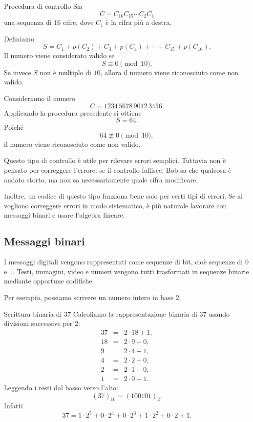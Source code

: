 \documentclass[a4paper]{article}
\begin{document}
\begin{snippetdefinition}{Procedura di controllo}
    Sia
    \[
        C=C_{16}C_{15}\cdots C_2C_1
    \]
    una sequenza di \(16\) cifre, dove \(C_1\) è la cifra più a destra.

    Definiamo
    \[
        S
        =
        C_1+p(C_2)+C_3+p(C_4)+\cdots+C_{15}+p(C_{16}).
    \]
    Il numero viene considerato valido se
    \[
        S\equiv 0 \pmod{10}.
    \]
    Se invece \(S\) non è multiplo di \(10\), allora il numero viene riconosciuto come non valido.
\end{snippetdefinition}

\begin{snippetexample}{}
    Consideriamo il numero
    \[
        C=1234\,5678\,9012\,3456.
    \]
    Applicando la procedura precedente si ottiene
    \[
        S=64.
    \]
    Poiché
    \[
        64\not\equiv 0 \pmod{10},
    \]
    il numero viene riconosciuto come non valido.
\end{snippetexample}

Questo tipo di controllo è utile per rilevare errori semplici. Tuttavia non è pensato per correggere l'errore: se il controllo fallisce, Bob sa che qualcosa è andato storto, ma non sa necessariamente quale cifra modificare.

Inoltre, un codice di questo tipo funziona bene solo per certi tipi di errori. Se si vogliono correggere errori in modo sistematico, è più naturale lavorare con messaggi binari e usare l'algebra lineare.

\subsection{Messaggi binari}

I messaggi digitali vengono rappresentati come sequenze di bit, cioè sequenze di \(0\) e \(1\). Testi, immagini, video e numeri vengono tutti trasformati in sequenze binarie mediante opportune codifiche.

Per esempio, possiamo scrivere un numero intero in base \(2\).

\begin{snippetexample}{Scrittura binaria di \(37\)}
    Calcoliamo la rappresentazione binaria di \(37\) usando divisioni successive per \(2\):
    \[
        \begin{array}{rcl}
            37 &=& 2\cdot 18+1,\\
            18 &=& 2\cdot 9+0,\\
            9 &=& 2\cdot 4+1,\\
            4 &=& 2\cdot 2+0,\\
            2 &=& 2\cdot 1+0,\\
            1 &=& 2\cdot 0+1.
        \end{array}
    \]
    Leggendo i resti dal basso verso l'alto:
    \[
        (37)_{10}=(100101)_2.
    \]
    Infatti
    \[
        37
        =
        1\cdot 2^5+0\cdot 2^4+0\cdot 2^3+1\cdot 2^2+0\cdot 2+1.
    \]
\end{snippetexample}
\end{document}
